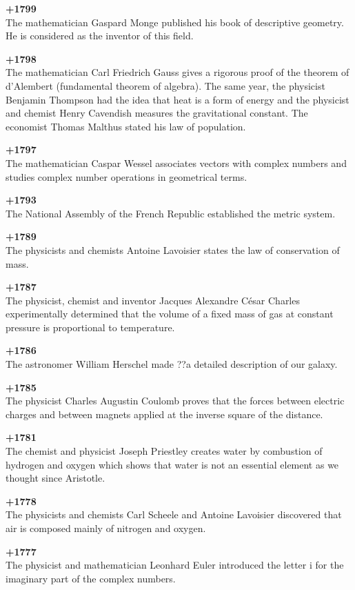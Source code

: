 \textbf{+1799}\\
The mathematician Gaspard Monge published his book of descriptive geometry. He is considered as the inventor of this field.

\textbf{+1798}\\
The mathematician Carl Friedrich Gauss gives a rigorous proof of the theorem of d'Alembert (fundamental theorem of algebra). The same year, the physicist Benjamin Thompson had the idea that heat is a form of energy and the physicist and chemist Henry Cavendish measures the gravitational constant. The economist Thomas Malthus stated his law of population.

\textbf{+1797}\\
The mathematician Caspar Wessel associates vectors with complex numbers and studies complex number operations in geometrical terms.

\textbf{+1793}\\
The National Assembly of the French Republic established the metric system.

\textbf{+1789}\\
The physicists and chemists Antoine Lavoisier states the law of conservation of mass.

\textbf{+1787}\\
The physicist, chemist and inventor Jacques Alexandre César Charles experimentally determined that the volume of a fixed mass of gas at constant pressure is proportional to temperature.

\textbf{+1786}\\
The astronomer William Herschel made ??a detailed description of our galaxy.

\pagebreak
\textbf{+1785}\\
The physicist Charles Augustin Coulomb proves that the forces between electric charges and between magnets applied at the inverse square of the distance.

\textbf{+1781}\\
The chemist and physicist Joseph Priestley creates water by combustion of hydrogen and oxygen which shows that water is not an essential element as we thought since Aristotle.

\textbf{+1778}\\
The physicists and chemists Carl Scheele and Antoine Lavoisier discovered that air is composed mainly of nitrogen and oxygen.

\textbf{+1777}\\
The physicist and mathematician Leonhard Euler introduced the letter i for the imaginary part of the complex numbers.

